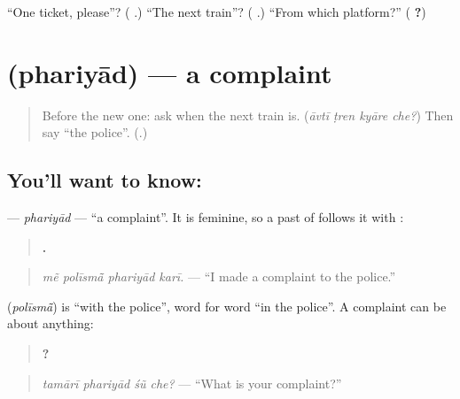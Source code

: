\begin{tcolorbox}[breakable,colback=teal!4,colframe=teal!35!black,title={Before you move on}]
\textquotedblleft{}One ticket, please\textquotedblright{}? (\textbf{  }.) \textquotedblleft{}The next train\textquotedblright{}? (\textbf{ }.) \textquotedblleft{}From which platform?\textquotedblright{} (\textbf{ ?})
\end{tcolorbox}
\section[\texorpdfstring{\gu{ફરિયાદ} (phariyād)}{ફરિયાદ (phariyād)}]{ (phariyād) — a complaint}

\label{lesson:GU-C280-phariyad}



\begin{quote}
Before the new one: ask when the next train is. (\emph{āvtī ṭren kyāre che?}) Then say \textquotedblleft{}the police\textquotedblright{}. (\textbf{}.)
\end{quote}

\subsection*{You'll want to know: }
\textbf{} — \emph{phariyād} — \textquotedblleft{}a complaint\textquotedblright{}. It is feminine, so a past of \textbf{} follows it with \textbf{}:

\begin{quote}
\textbf{   .}
\end{quote}

\begin{quote}
\emph{mẽ polīsmā̃ phariyād karī.} — \textquotedblleft{}I made a complaint to the police.\textquotedblright{}
\end{quote}

\textbf{} (\emph{polīsmā̃}) is \textquotedblleft{}with the police\textquotedblright{}, word for word \textquotedblleft{}in the police\textquotedblright{}. A complaint can be about anything:

\begin{quote}
\textbf{   ?}
\end{quote}

\begin{quote}
\emph{tamārī phariyād śũ che?} — \textquotedblleft{}What is your complaint?\textquotedblright{}
\end{quote}

